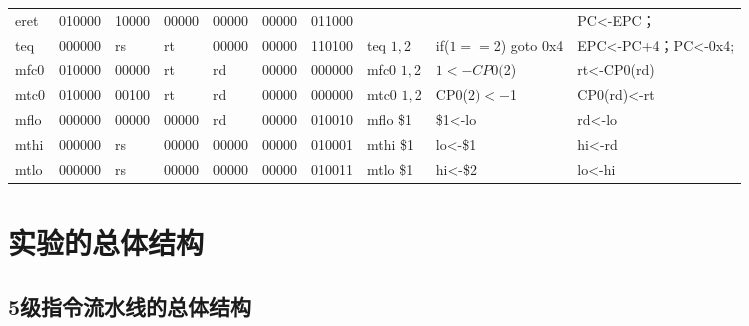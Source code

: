 \documentclass[12pt,a4paper]{article}
\begin{document}
\begin{landscape}
\begin{table}[]
{\begin{tabular}{llllllllll}
eret    & 010000 & 10000   & 00000 & 00000     & 00000 & 011000 &                &                                            & PC\textless{}-EPC；                                                                           \\
teq     & 000000 & rs      & rt    & 00000     & 00000 & 110100 & teq $1,$2      & if($1==$2) goto 0x4                        & EPC\textless{}-PC+4；PC\textless{}-0x4;                                                       \\
mfc0    & 010000 & 00000   & rt    & rd        & 00000 & 000000 & mfc0 $1,$2     & $1<-CP0($2)                                & rt\textless{}-CP0(rd)                                                                        \\
mtc0    & 010000 & 00100   & rt    & rd        & 00000 & 000000 & mtc0 $1,$2     & CP0($2)<-$1                                & CP0(rd)\textless{}-rt                                                                        \\
mflo    & 000000 & 00000   & 00000 & rd        & 00000 & 010010 & mflo \$1       & \$1\textless{}-lo                          & rd\textless{}-lo                                                                             \\
mthi    & 000000 & rs      & 00000 & 00000     & 00000 & 010001 & mthi \$1       & lo\textless{}-\$1                          & hi\textless{}-rd                                                                             \\
mtlo    & 000000 & rs      & 00000 & 00000     & 00000 & 010011 & mtlo \$1       & hi\textless{}-\$2                          & lo\textless{}-hi                                                                                \\ \hline
\end{tabular}%
}
\end{table}
\end{landscape}





\section{实验的总体结构}

\subsection{5级指令流水线的总体结构}
\end{document}
